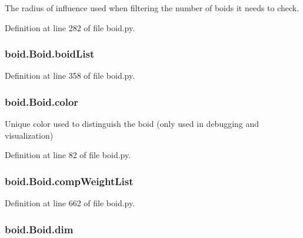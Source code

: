 The radius of influence used when filtering the number of boids it needs to check. 



Definition at line 282 of file boid.\-py.

\hypertarget{classboid_1_1Boid_a6d3a16e56bd3cc7efabf9ac7cae4ae16}{
\subsubsection[{boid\-List}]{\setlength{\rightskip}{0pt plus 5cm}boid.\-Boid.\-boid\-List}}\label{classboid_1_1Boid_a6d3a16e56bd3cc7efabf9ac7cae4ae16}


Definition at line 358 of file boid.\-py.

\hypertarget{classboid_1_1Boid_a6a2ca3d501e4b2b0d531d4d968487907}{
\subsubsection[{color}]{\setlength{\rightskip}{0pt plus 5cm}boid.\-Boid.\-color}}\label{classboid_1_1Boid_a6a2ca3d501e4b2b0d531d4d968487907}


Unique color used to distinguish the boid (only used in debugging and visualization) 



Definition at line 82 of file boid.\-py.

\hypertarget{classboid_1_1Boid_a811abb81b81e3b3e8e08e77a908ddb58}{
\subsubsection[{comp\-Weight\-List}]{\setlength{\rightskip}{0pt plus 5cm}boid.\-Boid.\-comp\-Weight\-List}}\label{classboid_1_1Boid_a811abb81b81e3b3e8e08e77a908ddb58}


Definition at line 662 of file boid.\-py.

\hypertarget{classboid_1_1Boid_a88a68e23e37b82bfe9862d7cd79542ad}{
\subsubsection[{dim}]{\setlength{\rightskip}{0pt plus 5cm}boid.\-Boid.\-dim}}\label{classboid_1_1Boid_a88a68e23e37b82bfe9862d7cd79542ad}


